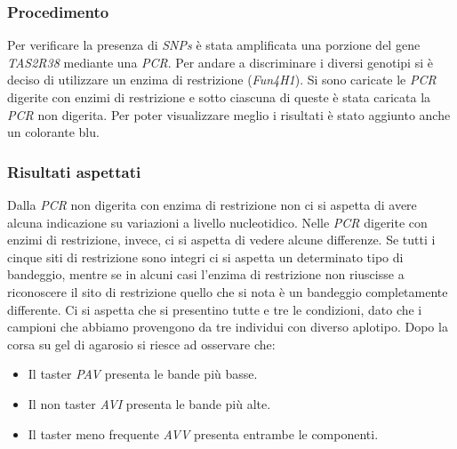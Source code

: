 		\subsubsection*{Procedimento}
		Per verificare la presenza di \emph{SNPs} è stata amplificata una porzione del gene \emph{TAS2R38} mediante una \emph{PCR}.
		Per andare a discriminare i diversi genotipi si è deciso di utilizzare un enzima di restrizione (\emph{Fun4H1}). 
		Si sono caricate le \emph{PCR} digerite con enzimi di restrizione e sotto ciascuna di queste è stata caricata la \emph{PCR} non digerita. 
		Per poter visualizzare meglio i risultati è stato aggiunto anche un colorante blu. 
	   
		\subsubsection*{Risultati aspettati}
		Dalla \emph{PCR} non digerita con enzima di restrizione non ci si aspetta di avere alcuna indicazione su variazioni a livello nucleotidico. 
		Nelle \emph{PCR} digerite con enzimi di restrizione, invece, ci si aspetta di vedere alcune differenze. 
		Se tutti i cinque siti di restrizione sono integri ci si aspetta un determinato tipo di bandeggio, mentre se in alcuni casi l'enzima di restrizione non riuscisse a riconoscere il sito di restrizione quello che si nota è un bandeggio completamente differente. 
		Ci si aspetta che si presentino tutte e tre le condizioni, dato che i campioni che abbiamo provengono da tre individui con diverso aplotipo. 
		Dopo la corsa su gel di agarosio si riesce ad osservare che:
		\begin{itemize}
			\item Il taster \emph{PAV} presenta le bande più basse.
			\item Il non taster \emph{AVI} presenta le bande più alte.
			\item Il taster meno frequente \emph{AVV} presenta entrambe le componenti. 
		\end{itemize}
	
